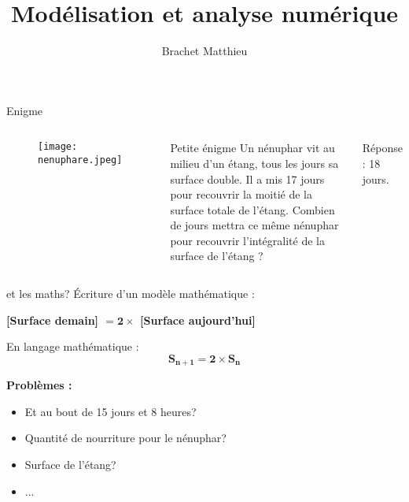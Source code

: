 \documentclass[11pt]{beamer}
\author{Brachet Matthieu}
\title{Modélisation et analyse numérique}
\begin{document}
\begin{frame}
\titlepage
\end{frame}


\begin{frame}{Enigme}
\begin{columns}
\begin{center}
\begin{figure}
\texttt{[image: nenuphare.jpeg]}
\end{figure}
\end{center}

\begin{block}{Petite énigme}
Un nénuphar vit au milieu d'un étang, tous les jours sa surface double. Il a mis 17 jours pour recouvrir la moitié de la surface totale de l'étang. Combien de jours mettra ce même nénuphar pour recouvrir l'intégralité de la surface de l'étang ?
\end{block}

\pause
\begin{flushright}
Réponse : 18 jours.
\end{flushright}
\end{columns}
\end{frame}


\begin{frame}{et les maths?}
\'Ecriture d'un modèle mathématique :
\begin{center}\textbf{
[Surface demain] $\mathbf{ = 2 \times }$ [Surface aujourd'hui]}
\end{center}

\pause
En langage mathématique :
$$
\mathbf{S_{n+1} = 2 \times S_n}
$$

\pause
\textbf{Problèmes :}
\begin{itemize}
\item Et au bout de 15 jours et 8 heures?
\item Quantité de nourriture pour le nénuphar?
\item Surface de l'étang?
\item ...
\end{itemize}
\end{frame}

\end{document}
